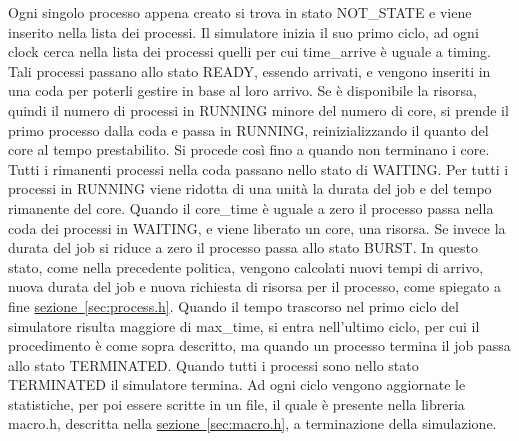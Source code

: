 \documentclass[Lau, oneside]{sapthesis}%
\begin{document}
Ogni singolo processo appena creato si trova in stato NOT\_STATE e viene inserito nella lista dei processi.
Il simulatore inizia il suo primo ciclo, ad ogni clock cerca nella lista dei processi quelli per cui time\_arrive è uguale a timing.
Tali processi passano allo stato READY, essendo arrivati, e vengono inseriti in una coda per poterli gestire in base al loro arrivo.
Se è disponibile la risorsa, quindi il numero di processi in RUNNING  minore del numero di core, si prende il primo processo dalla coda e passa in RUNNING, reinizializzando il quanto del core al tempo prestabilito.
Si procede così fino a quando non terminano i core.
Tutti i rimanenti processi nella coda passano nello stato di WAITING.
Per tutti i processi in RUNNING viene ridotta di una unità la durata del job e del tempo rimanente del core.
Quando il core\_time è uguale a zero il processo passa nella coda dei processi in WAITING, e viene liberato un core, una risorsa.
Se invece la durata del job si riduce a zero il processo passa allo stato BURST.
In questo stato, come nella precedente politica, vengono calcolati nuovi tempi di arrivo, nuova durata del job e nuova richiesta di risorsa per il processo, come spiegato a fine \hyperref[sec:process.h]{sezione~\ref*{sec:process.h}}.
Quando il tempo trascorso nel primo ciclo del simulatore risulta maggiore di max\_time, si entra nell'ultimo ciclo, per cui il procedimento è come sopra descritto, ma quando un processo termina il job passa allo stato TERMINATED.
Quando tutti i processi sono nello stato TERMINATED il simulatore termina.
Ad ogni ciclo vengono aggiornate le statistiche, per poi essere scritte in un file, il quale è presente nella libreria macro.h, descritta nella \hyperref[sec:macro.h]{sezione~\ref*{sec:macro.h}}, a terminazione della simulazione.
\end{document}
